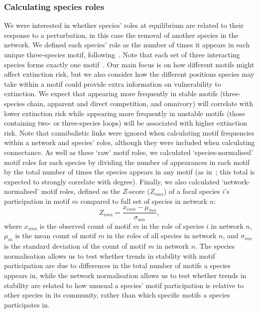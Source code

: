 \documentclass[12pt]{article}
\begin{document}
\begin{spacing}{1.0}
    
    	\subsubsection*{Calculating species roles}
    
    
    		We were interested in whether species' roles at equilibrium are related to their response to a perturbation, in this case the removal of another species in the network. We defined each species' role as the number of times it appears in each unique three-species motif, following~\citet{Stouffer2012,Cirtwill2015}. Note that each set of three interacting species forms exactly one motif~\citep{Cirtwill2018FoodWebs}. Our main focus is on how different motifs might affect extinction risk, but we also consider how the different positions species may take within a motif could provide extra information on vulnerability to extinction. We expect that appearing more frequently in stable motifs (three-species chain, apparent and direct competition, and omnivory) will correlate with lower extinction risk while appearing more frequently in unstable motifs (those containing two- or three-species loops) will be associated with higher extinction risk.	Note that cannibalistic links were ignored when calculating motif frequencies within a network and species' roles, although they were included when calculating connectance. As well as these `raw' motif roles, we calculated `species-normalised' motif roles for each species by dividing the number of appearances in each motif by the total number of times the species appears in any motif (as in~\citet{Cirtwill2015}; this total is expected to strongly correlate with degree). Finally, we also calculated `network-normalised' motif roles, defined as the $Z$-score ($Z_{imn}$) of a focal species $i$'s participation in motif $m$ compared to full set of species in network $n$:
    		\begin{equation}
    		Z_{imn} = \frac{x_{imn}-\mu_{mn}}{\sigma_{mn}} ,
    		\end{equation}
    		where $x_{imn}$ is the observed count of motif $m$ in the role of species $i$ in network $n$, $\mu_m$ is the mean count of motif $m$ in the roles of all species in network $n$, and $\sigma_{mn}$ is the standard deviation of the count of motif $m$ in network $n$.
    		The species normalisation allows us to test whether trends in stability with motif participation are due to differences in the total number of motifs a species appears in, while the network normalisation allows us to test whether trends in stability are related to how unusual a species' motif participation is relative to other species in its community, rather than which specific motifs a species participates in.
    

\end{spacing}
\end{document}
